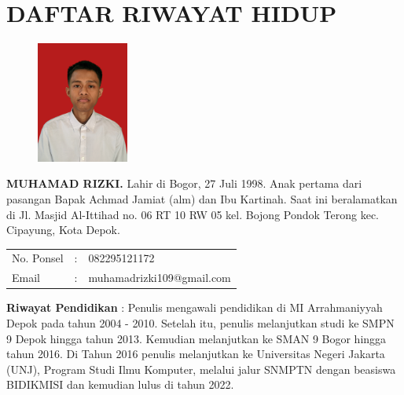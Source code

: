 \pagestyle{empty}
\chapter*{\centering \large DAFTAR RIWAYAT HIDUP}
\thispagestyle{empty}

\begin{figure}
	\vspace{-25pt}
	\begin{center}
		\includegraphics[width=0.27\textwidth]{gambar/pas-foto}
	\end{center}
	\vspace{-80pt}
\end{figure}

\noindent \textbf{MUHAMAD RIZKI.}  Lahir di Bogor, 27 Juli 1998.  Anak pertama dari pasangan Bapak Achmad Jamiat (alm) dan Ibu Kartinah. Saat ini beralamatkan di Jl. Masjid Al-Ittihad no. 06 RT 10 RW 05 kel. Bojong Pondok Terong kec. Cipayung, Kota Depok.

\vspace{0.5cm}
\noindent
\begin{center}
	\begin{flushright}
		\begin{tabular}{lcl}
			No. Ponsel	& :&  082295121172 \\
			Email	& :&  muhamadrizki109@gmail.com
		\end{tabular}
	\end{flushright}
\end{center}
\vspace{0.5cm}

\noindent \textbf{Riwayat Pendidikan} : Penulis mengawali pendidikan di MI Arrahmaniyyah Depok pada tahun 2004 - 2010. Setelah itu, penulis melanjutkan studi ke SMPN 9 Depok hingga tahun 2013. Kemudian melanjutkan ke SMAN 9 Bogor hingga tahun 2016. Di Tahun 2016 penulis melanjutkan ke Universitas Negeri Jakarta (UNJ), Program Studi Ilmu Komputer, melalui jalur SNMPTN dengan beasiswa BIDIKMISI dan kemudian lulus di tahun 2022.

